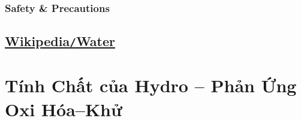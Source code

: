 \documentclass{article}
\begin{document}
\subsubsection{Safety \& Precautions}


\subsection{\href{https://en.wikipedia.org/wiki/Water}{Wikipedia\texttt{/}Water}}


\section{Tính Chất của Hydro -- Phản Ứng Oxi Hóa--Khử}


\printbibliography[heading=bibintoc]
	
\end{document}

